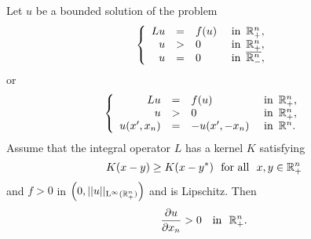 \begin{proposition}
\label{Prop: MonotonyHalfSpace}
Let $u$ be a bounded solution of the problem
\begin{equation}
\label{Eq: HalfSpaceZero}
\left\{\begin{array}{rcll}
Lu &=& f(u)   &\textrm{ in } \,\mathbb{R}^n_+,\\
u &>& 0   &\textrm{ in } \,\mathbb{R}^n_+,\\
u &=& 0   &\textrm{ in } \,\overline{\mathbb{R}^n_-},
\end{array} \right.
\end{equation}
or
\begin{equation}
\label{Eq: HalfSpaceOdd}
\left\{\begin{array}{rcll}
Lu &=& f(u)   &\textrm{ in } \,\mathbb{R}^n_+,\\
u &>& 0   &\textrm{ in } \,\mathbb{R}^n_+,\\
u(x',x_n) &=& -u(x',-x_n)   &\textrm{ in } \,\mathbb{R}^n.
\end{array} \right.
\end{equation}
Assume that the integral operator $L$ has a kernel $K$ satisfying
$$ K(x-y) \geq K(x-y^*) \,\,\,\,\text{for all } \,\, x,y\in \mathbb{R}^n_+ $$
and $f>0$ in $\left(0,||u||_{\mathrm{L}^{\infty}(\mathbb{R}^n_+)}\right)$ and is Lipschitz. Then
$$ \frac{\partial u}{\partial x_n} > 0 \,\,\,\, \text{ in } \,\,\mathbb{R}^n_+. $$
\end{proposition}


